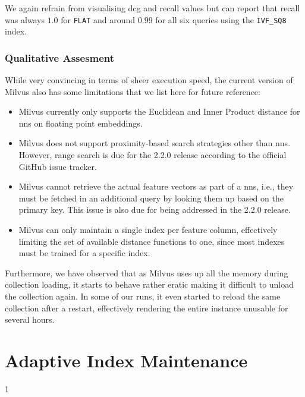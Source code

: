 We again refrain from visualising \acrshort{dcg} and recall values but can report that recall was always $1.0$ for \texttt{FLAT} and around $0.99$ for all six queries using the \texttt{IVF\_SQ8} index.

\subsubsection{Qualitative Assesment}
While very convincing in terms of sheer execution speed, the current version of Milvus also has some limitations that we list here for future reference:

\begin{itemize}
    \item Milvus currently only supports the Euclidean and Inner Product distance for \acrshort{nns} on floating point embeddings.
    \item Milvus does not support proximity-based search strategies other than \acrshort{nns}. However, range search is due for the 2.2.0 release according to the official GitHub issue tracker.
    \item Milvus cannot retrieve the actual feature vectors as part of a \acrshort{nns}, i.e., they must be fetched in an additional query by looking them up based on the primary key. This issue is also due for being addressed in the 2.2.0 release.
    \item Milvus can only maintain a single index per feature column, effectively limiting the set of available distance functions to one, since most indexes must be trained for a specific index.
\end{itemize}

Furthermore, we have observed that as Milvus uses up all the memory during collection loading, it starts to behave rather eratic making it difficult to unload the collection again. In some of our runs, it even started to reload the same collection after a restart, effectively rendering the entire instance unusable for several hours.

\section{Adaptive Index Maintenance}
\label{section:evaluation_adaptive_index_maintenance}
1